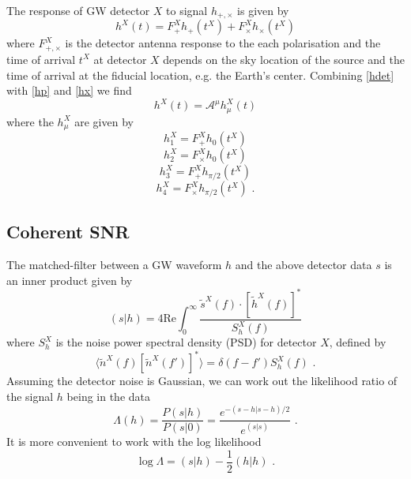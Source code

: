 \documentclass[11pt]{cuthesis}
\begin{document}
The response of GW detector $X$ to signal $h_{+,\times}$ is given by
\begin{equation} \label{hdet}
h^X(t) = F_+^X h_+(t^X) + F_\times^X h_\times (t^X)
\end{equation}
where $F_{+,\times}^X$ is the detector antenna response to the each polarisation and the time of arrival $t^X$ at detector $X$ depends on the sky location of the source and the time of arrival at the fiducial location, e.g. the Earth's center. Combining \ref{hdet} with \ref{hp} and \ref{hx} we find
\begin{equation}
h^X(t) = \mathcal{A}^\mu h_\mu^X(t) 
\end{equation}
where the $h_\mu^X$ are given by
\begin{equation}
h_1^X = F_+^X h_0(t^X) 
\end{equation}
\begin{equation}
h_2^X = F_\times^X h_0(t^X) 
\end{equation}
\begin{equation}
h_3^X = F_+^X h_{\pi/2}(t^X) 
\end{equation}
\begin{equation}
h_4^X = F_\times^X h_{\pi/2}(t^X) \textbf{ .} 
\end{equation}

\subsection{Coherent SNR} \label{sec:coh snr}
The matched-filter between a GW waveform $h$ and the above detector data $s$ is an inner product given by 
\begin{equation}
(s|h) = 4 \text{Re} \int^\infty_0 \frac{\tilde{s}^X(f) \cdot [\tilde{h}^X(f)]^*}{S^X_h (f)}
\end{equation}
where $S^X_h$ is the noise power spectral density (PSD) for detector $X$, defined by
\begin{equation}
\langle \tilde{n}^X(f) [\tilde{n}^X(f')]^* \rangle = \delta (f-f') S^X_h(f) \textbf{ .}
\end{equation} 
Assuming the detector noise is Gaussian, we can work out the likelihood ratio of the signal $h$ being in the data
\begin{equation}
\Lambda (h) = \frac{P(s|h)}{P(s|0)} = \frac{e^{-(s-h|s-h)/2}}{e^{(s|s)}} \textbf{ .}
\end{equation}
It is more convenient to work with the log likelihood 
\begin{equation}
\log \Lambda = (s|h) - \frac{1}{2}(h|h) \textbf{ .}
\end{equation}
\end{document}
